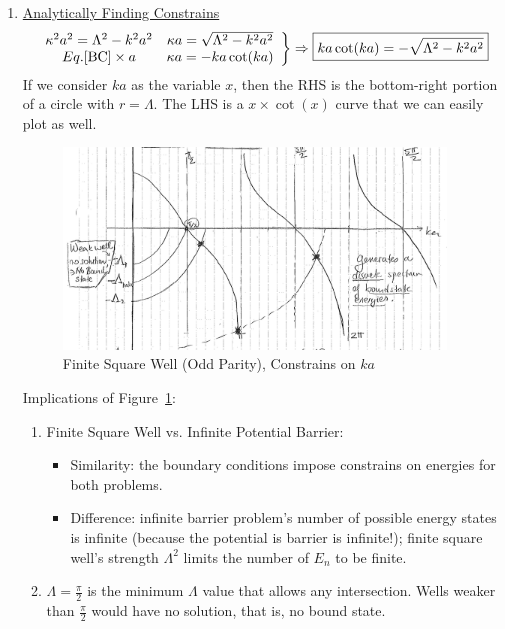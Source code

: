 \documentclass{school-22.101-notes}
\begin{document}
\begin{enumerate}
\item \uline{Analytically Finding Constrains}
\begin{align}
\left.
\begin{array}{cc} 
\kappa^2 a^2 = \Lambda^2 - k^2 a^2  & \kappa a = \sqrt{\Lambda^2 - k^2 a^2} \\
Eq.\ref{BC} \times a                & \kappa a = - ka \cot (ka)
\end{array}
\right\}  \Rightarrow \boxed{ ka \cot (ka) = - \sqrt{ \Lambda^2 - k^2 a^2 } } 
\end{align}
If we consider $ka$ as the variable $x$, then the RHS is the bottom-right portion of a circle with $r = \Lambda$. The LHS is a $x \times \cot(x)$ curve that we can easily plot as well.
\begin{figure}[h!]
    \centering
    \includegraphics[width=4in]{images/qm/FSW-odd-graph-ka.png}
    \caption{Finite Square Well (Odd Parity), Constrains on $ka$\label{FSW-odd-graph-ka}}
\end{figure}
Implications of Figure~\ref{FSW-odd-graph-ka}: 
\begin{enumerate}
    \item Finite Square Well vs. Infinite Potential Barrier:
    \begin{itemize}
    \item Similarity: the boundary conditions impose constrains on energies for both problems. 
    \item Difference: infinite barrier problem's number of possible energy states is infinite (because the potential is barrier is infinite!); finite square well's strength $\Lambda^2$ limits the number of $E_n$ to be finite.  
    \end{itemize}
    
    \item $\Lambda = \frac{\pi}{2}$ is the minimum $\Lambda$ value that allows any intersection. Wells weaker than $\frac{\pi}{2}$ would have no solution, that is, no bound state. 
     

\end{enumerate}
\end{enumerate}
\end{document}
